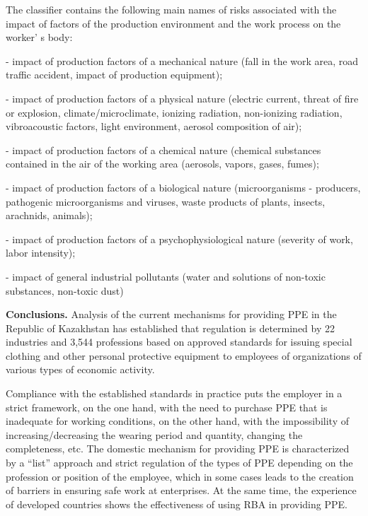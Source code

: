 \begin{multicols}{2}
The classifier contains the following main names of risks associated
with the impact of factors of the production environment and the work
process on the worker' s body:

- impact of production factors of a mechanical nature (fall in the work
area, road traffic accident, impact of production equipment);

- impact of production factors of a physical nature (electric current,
threat of fire or explosion, climate/microclimate, ionizing radiation,
non-ionizing radiation, vibroacoustic factors, light environment,
aerosol composition of air);

- impact of production factors of a chemical nature (chemical substances
contained in the air of the working area (aerosols, vapors, gases,
fumes);

- impact of production factors of a biological nature (microorganisms -
producers, pathogenic microorganisms and viruses, waste products of
plants, insects, arachnids, animals);

- impact of production factors of a psychophysiological nature (severity
of work, labor intensity);

- impact of general industrial pollutants (water and solutions of
non-toxic substances, non-toxic dust)

{\bfseries Conclusions.} Analysis of the current mechanisms for providing
PPE in the Republic of Kazakhstan has established that regulation is
determined by 22 industries and 3,544 professions based on approved
standards for issuing special clothing and other personal protective
equipment to employees of organizations of various types of economic
activity.

Compliance with the established standards in practice puts the employer
in a strict framework, on the one hand, with the need to purchase PPE
that is inadequate for working conditions, on the other hand, with the
impossibility of increasing/decreasing the wearing period and quantity,
changing the completeness, etc. The domestic mechanism for providing PPE
is characterized by a ``list'' approach and strict regulation of the
types of PPE depending on the profession or position of the employee,
which in some cases leads to the creation of barriers in ensuring safe
work at enterprises. At the same time, the experience of developed
countries shows the effectiveness of using RBA in providing PPE.


\end{multicols}
